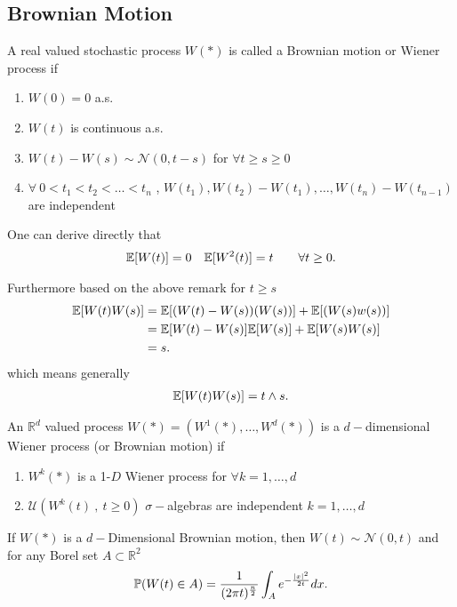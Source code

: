 \subsection{Brownian Motion}
\begin{definition}
 A real valued stochastic process $W(*)$ is called a Brownian motion 
 or Wiener process if 
 \begin{enumerate}
   \item $W(0) = 0$ a.s.
   \item $W(t)$ is continuous a.s.
   \item $W(t) - W(s) \sim \mathcal{N}(0,t-s)$ for $\forall t\ge s\ge 0$
   \item $\forall \ 0 < t_{1}<t_{2}<\ldots <t_n$ , $W(t_{1}),W(t_{2})-W(t_{1}),\ldots ,W(t_n)-W(t_{n-1})$ are independent 
 \end{enumerate}
\end{definition}
\begin{remark}
 One can derive directly that 
 \begin{align*}
   \mathbb{E}[W(t)] = 0 \quad \mathbb{E}[W^2(t)] = t \qquad \forall t \ge 0
 .\end{align*}
\end{remark}
Furthermore based on the above remark for $t\ge s$ 
\begin{align*}
  \mathbb{E}[W(t)W(s)] &= \mathbb{E}[(W(t)-W(s))(W(s))]+\mathbb{E}[(W(s)w(s))]\\
               &= \mathbb{E}[W(t)-W(s)]\mathbb{E}[W(s)] + \mathbb{E}[W(s)W(s)] \\
               &= s
.\end{align*}
which means generally 
\begin{align*}
  \mathbb{E}[W(t)W(s)] = t \land s
.\end{align*}
\begin{definition}
 An $\mathbb{R}^{d} $  valued process $W(*) = (W^{1}(*),\ldots ,W^{d}(*)  )$ is a $d-$dimensional Wiener process (or Brownian motion) if
 \begin{enumerate}
   \item $W^{k}(*) $ is a 1-$D$ Wiener process for $\forall  k =1 ,\ldots ,d$
   \item $\mathcal{U}(W^{k}(t) \ , \ t\ge 0 )$ $\sigma-$algebras are independent $k=1,\ldots ,d$
 \end{enumerate}
\end{definition}
\begin{remark}
 If $W(*)$  is  a $d-$Dimensional Brownian motion, then $W(t) \sim \mathcal{N}(0,t)$ and for any Borel set $A \subset  \mathbb{R}^{2} $
 \begin{align*}
  \mathbb{P}(W(t) \in  A) = \frac{1}{(2\pi t)^{\frac{n}{2}} } \int_A e^{-\frac{\lvert x\rvert^2}{2t}} dx
 .\end{align*}
\end{remark}

